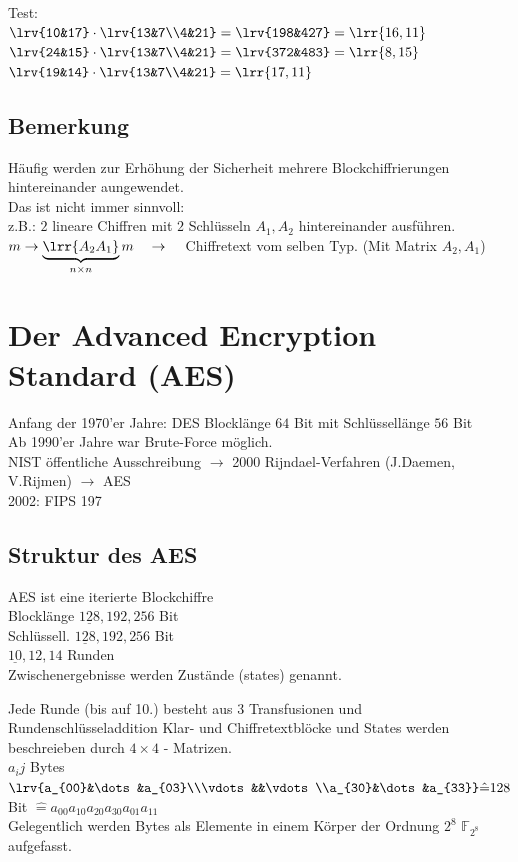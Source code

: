 		Test:\\
		$\lrv{10&17}\cdot\lrv{13&7\\4&21}=\lrv{198&427}=\lrr{16,11}$\\
		$\lrv{24&15}\cdot\lrv{13&7\\4&21}=\lrv{372&483}=\lrr{8,15}$\\
		$\lrv{19&14}\cdot\lrv{13&7\\4&21}=\lrr{17,11}$
	\subsection{Bemerkung}
		Häufig werden zur Erhöhung der Sicherheit mehrere Blockchiffrierungen hintereinander aungewendet.\\
		Das ist nicht immer sinnvoll:\\
		z.B.: $2$ lineare Chiffren mit $2$ Schlüsseln $A_1,A_2$ hintereinander ausführen.\\
		$m\rightarrow\underbrace{\lrr{A_2A_1}}_{n\times n} m \quad \rightarrow\quad$ Chiffretext vom selben Typ. (Mit Matrix $A_2,A_1$)
\section{Der Advanced Encryption Standard (AES)}
	Anfang der 1970'er Jahre: DES Blocklänge $64$ Bit mit Schlüssellänge $56$ Bit\\
	Ab 1990'er Jahre war Brute-Force möglich.\\
	NIST öffentliche Ausschreibung $\rightarrow$	2000 Rijndael-Verfahren (J.Daemen, V.Rijmen) $\rightarrow$ AES\\
	2002: FIPS 197
	\subsection{Struktur des AES}
		AES ist eine iterierte Blockchiffre\\
		Blocklänge $\underline{128},192,256$ Bit\\
		Schlüssell. $\underline{128},192,256$ Bit\\
		$\underline{10},12,14$ Runden\\
		Zwischenergebnisse werden Zustände (states) genannt.
		
		Jede Runde (bis auf 10.) besteht aus 3 Transfusionen und Rundenschlüsseladdition
		Klar- und Chiffretextblöcke und States werden beschreieben durch $4\times 4$ - Matrizen.\\
		$a_ij$ Bytes $\lrv{a_{00}&\dots&a_{03}\\\vdots&&\vdots\\a_{30}&\dots&a_{33}}\hat{=} 128$ Bit $\hat{=} a_{00}a_{10}a_{20}a_{30}a_{01}a_{11}$\\
		Gelegentlich werden Bytes als Elemente in einem Körper der Ordnung $2^8$ $\mathbb{F}_{2^8}$ aufgefasst.
